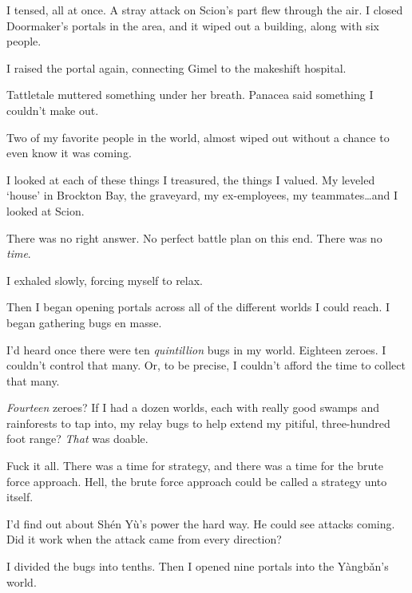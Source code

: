 I tensed, all at once.  A stray attack on Scion's part flew through the air.  I closed Doormaker's portals in the area, and it wiped out a building, along with six people.



I raised the portal again, connecting Gimel to the makeshift hospital.



Tattletale muttered something under her breath.  Panacea said something I couldn't make out.



Two of my favorite people in the world, almost wiped out without a chance to even know it was coming.



I looked at each of these things I treasured, the things I valued.  My leveled `house' in Brockton Bay, the graveyard, my ex-employees, my teammates\ldots and I looked at Scion.



There was no right answer.  No perfect battle plan on this end.  There was no \emph{time}.



I exhaled slowly, forcing myself to relax.



Then I began opening portals across all of the different worlds I could reach.  I began gathering bugs en masse.



I'd heard once there were ten \emph{quintillion} bugs in my world.  Eighteen zeroes.  I couldn't control that many.  Or, to be precise, I couldn't afford the time to collect that many.



\emph{Fourteen} zeroes?  If I had a dozen worlds, each with really good swamps and rainforests to tap into, my relay bugs to help extend my pitiful, three-hundred foot range?  \emph{That} was doable.



Fuck it all.  There was a time for strategy, and there was a time for the brute force approach.  Hell, the brute force approach could be called a strategy unto itself.



I'd find out about Sh\'{e}n Y\`{u}'s power the hard way.  He could see attacks coming.  Did it work when the attack came from every direction?



I divided the bugs into tenths.  Then I opened nine portals into the Y\`{a}ngb\v{a}n's world.



